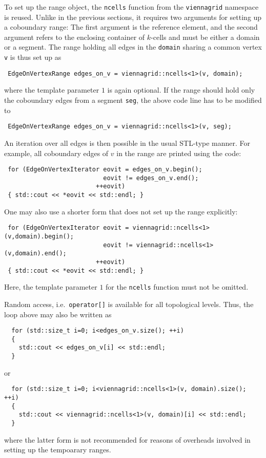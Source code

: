 To set up the range object, the \lstinline|ncells| function from the \lstinline|viennagrid| namespace is reused. Unlike in the previous sections, it requires two arguments
for setting up a coboundary range: The first argument is the reference element, and the second argument refers to the enclosing container of $k$-cells and must be either a domain or a segment.
The range holding all edges in the \lstinline|domain| sharing a common vertex \lstinline|v| is thus set up as
\begin{lstlisting}
 EdgeOnVertexRange edges_on_v = viennagrid::ncells<1>(v, domain);
\end{lstlisting}
where the template parameter $1$ is again optional.
If the range should hold only the coboundary edges from a segment \lstinline|seg|, the above code line has to be modified to
\begin{lstlisting}
 EdgeOnVertexRange edges_on_v = viennagrid::ncells<1>(v, seg);
\end{lstlisting}
An iteration over all edges is then possible in the usual STL-type manner. For example, all coboundary edges of $v$ in the range are printed using the code:
\begin{lstlisting}
 for (EdgeOnVertexIterator eovit = edges_on_v.begin();
                           eovit != edges_on_v.end();
                         ++eovit)
 { std::cout << *eovit << std::endl; }
\end{lstlisting}
One may also use a shorter form that does not set up the range explicitly:
\begin{lstlisting}
 for (EdgeOnVertexIterator eovit = viennagrid::ncells<1>(v,domain).begin();
                           eovit != viennagrid::ncells<1>(v,domain).end();
                         ++eovit)
 { std::cout << *eovit << std::endl; }
\end{lstlisting}
Here, the template parameter $1$ for the \lstinline|ncells| function must not be omitted.

Random access, i.e.~\lstinline|operator[]| is available for all topological levels. Thus, the loop above may also be written as
\begin{lstlisting}
  for (std::size_t i=0; i<edges_on_v.size(); ++i)
  {
    std::cout << edges_on_v[i] << std::endl;
  }
\end{lstlisting}
or 
\begin{lstlisting}
  for (std::size_t i=0; i<viennagrid::ncells<1>(v, domain).size(); ++i)
  {
    std::cout << viennagrid::ncells<1>(v, domain)[i] << std::endl;
  }
\end{lstlisting}
where the latter form is not recommended for reasons of overheads involved in setting up the tempoarary ranges.

